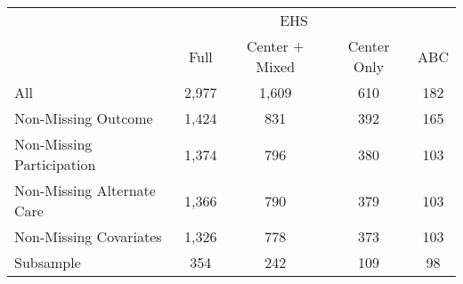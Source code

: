 \begin{tabular}{lcccc}
\toprule 
\midrule 
 & \multicolumn{3}{c}{EHS} &  \\
 \cmidrule(lr){2-4} 
 & Full & Center $+$ Mixed & Center Only & ABC \\
\midrule 
All & 2,977 & 1,609 & 610 & 182 \\
Non-Missing Outcome & 1,424 & 831 & 392 & 165 \\
Non-Missing Participation & 1,374 & 796 & 380 & 103 \\
Non-Missing Alternate Care & 1,366 & 790 & 379 & 103 \\
Non-Missing Covariates & 1,326 & 778 & 373 & 103 \\
Subsample & 354 & 242 & 109 & 98 \\
\midrule 
\bottomrule 
\end{tabular}
